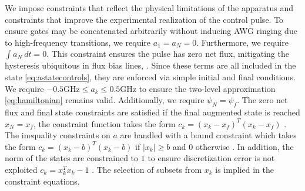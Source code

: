 We impose constraints that
reflect the physical limitations of the apparatus and 
constraints that improve the experimental realization of the control pulse.
To ensure gates may be concatenated arbitrarily without
inducing AWG ringing due to high-frequency transitions,
we require $a_{1} = a_{N} = 0$.
Furthermore, we require $\int a_{N} \ dt = 0$. This
constraint ensures the pulse has zero net flux, mitigating
the hysteresis ubiquitous in flux bias lines,
\cite{battistel2019fast, krantz2019quantum, zhang2020universal}. 
Since these terms are all included in the state \eqref{eq:astatecontrols},
they are enforced via simple initial and final conditions.
We require $-0.5 \textrm{GHz} \le a_{k} \le 0.5 \textrm{GHz}$
to ensure the two-level approximation \eqref{eq:hamiltonian}
remains valid. Additionally, we require
$\psi_{N} = \psi_{f}$.
The zero net flux and final state constraints
are satisfied if the final augmented state is
reached $x_{N} = x_{f}$, the constraint function
takes the form
$c_{k} = (x_{k} - x_{f})^{T}(x_{k} - x_{f})$ .
The inequality constraints on $a$ are handled
with a bound constraint which takes the form
$c_{k} = (x_{k} - b)^{T}(x_{k} - b)$ if $\lvert x_{k} \rvert \ge b$
and $0$ otherwise .
In addition, the norm of the states
are constrained to $1$ to ensure discretization error is not
exploited $c_{k} = x_{k}^{T}x_{k} - 1$ . 
The selection of subsets from $x_{k}$ is implied in
the constraint equations. 
